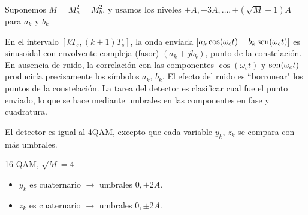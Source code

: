 \noindent Suponemos $M=M_a^2=M_b^2$, y usamos los niveles $\pm
A,\pm 3A,\ldots,\pm(\sqrt{M}-1)A$ para $a_k$ y $b_k$


En el intervalo $[k T_s, (k+1)T_s]$, la onda enviada
$\left[a_k\cos(\omega_ct)-b_k\operatorname{sen}(\omega_ct)\right]$ es sinusoidal con envolvente compleja (fasor) $(a_k+jb_k)$, punto de la constelación.
En ausencia de ruido, la correlación con las componentes $\cos(\omega_ct)$ y $\operatorname{sen}(\omega_ct)$ produciría precisamente los símbolos $a_k$, $b_k$. El efecto del ruido es ``borronear" los puntos de la constelación. La tarea del detector es clasificar cual fue el punto enviado, lo que se hace mediante umbrales en las componentes en fase y cuadratura.

El detector es igual al 4QAM, excepto que cada variable $y_k$, $z_k$ se compara con más umbrales.


\newpage

%
\begin{minipage}{0.5\textwidth}
\begin{ejemplo} 16 QAM, $\sqrt{M}=4$
\begin{itemize}
    \item $y_k$ es cuaternario $\rightarrow$ umbrales $0,\pm 2A$.
    \item $z_k$ es cuaternario $\rightarrow$ umbrales $0,\pm 2A$.
\end{itemize}
\end{ejemplo}
\end{minipage}
\begin{minipage}{0.5\textwidth}
    \end{minipage}



